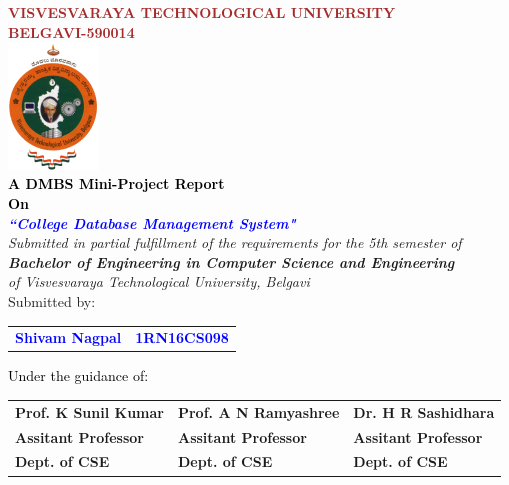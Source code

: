 
\begin{titlepage}
\begin{center}
\break\break
\textup{\large {\textcolor{brown}{\bf VISVESVARAYA TECHNOLOGICAL UNIVERSITY} \\ {\textcolor{brown}{\bf BELGAVI-590014}}}}\\[0.1in]
\includegraphics[width=0.18\textwidth]{./VTU.png}\\[0.1in]
\textup{\small {\textcolor{black}{\textbf {A DMBS Mini-Project Report} \\ {\textbf {On}}}}} \\[0.2in]
\textup{\large {\textcolor{blue}{\textbf {\textit {``College Database Management System"}}}}} \\[0.2in]
\textup{{\textit {Submitted in partial fulfillment of the requirements for the 5th semester of} \\ {\textbf {\textit {Bachelor of Engineering in Computer Science and Engineering}} \\ \textit {of Visvesvaraya Technological University, Belgavi}}}}\\[0.15in]
\textup{Submitted by:}
\break\break
\begin{tabular}{l  l}
\textcolor{blue}{\textbf{Shivam Nagpal}} & \textcolor{blue}{\hspace{2.7cm}\textbf{1RN16CS098}}\\[0.3in]

\end{tabular}
\break\break\break\break
\textup{\normalsize {\textcolor{black}{ Under the guidance of:}}}\break\break
\begin{tabular}{l l l}
\textbf{Prof. K Sunil Kumar} & \hspace{0.7cm}\textbf{Prof. A N Ramyashree} & \hspace{0.7cm}\textbf{Dr. H R Sashidhara}\\
\textbf{Assitant Professor} & \hspace{0.7cm}\textbf{Assitant Professor}  & \hspace{0.7cm}\textbf{Assitant Professor}\\
\textbf{Dept. of CSE} & \hspace{0.7cm}\textbf{Dept. of CSE}  & \hspace{0.7cm}\textbf{Dept. of CSE}\\[0.2in]
\end{tabular}


\end{center}
\end{titlepage}
